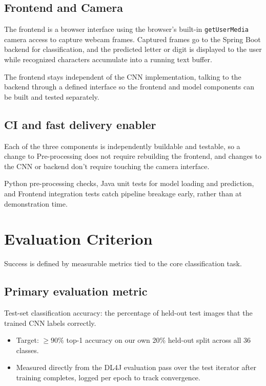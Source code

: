\documentclass[12pt,a4paper]{article}
\begin{document}
\subsection{Frontend and Camera}

The frontend is a browser interface using the browser's built-in \texttt{getUserMedia} camera
access to capture webcam frames. Captured frames go to the Spring Boot backend for
classification, and the predicted letter or digit is displayed to the user while recognized
characters accumulate into a running text buffer.

The frontend stays independent of the CNN implementation, talking to the backend through a
defined interface so the frontend and model components can be built and tested separately.


\subsection{CI and fast delivery enabler}

Each of the three components is independently buildable and testable, so a change to
Pre-processing does not require rebuilding the frontend, and changes to the CNN or backend don't
require touching the camera interface.

Python pre-processing checks, Java unit tests for model loading and prediction, and
Frontend integration tests catch pipeline breakage early, rather than at demonstration time.


\section{Evaluation Criterion}

Success is defined by measurable metrics tied to the core classification task.


\subsection{Primary evaluation metric}

Test-set classification accuracy: the percentage of held-out test images that the trained CNN
labels correctly.

\begin{itemize}[leftmargin=*]

  \item Target: $\geq 90\%$ top-1 accuracy on our own 20\% held-out split across all 36
  classes.

  \item Measured directly from the DL4J evaluation pass over the test iterator after training
  completes, logged per epoch to track convergence.

\end{itemize}
\end{document}
